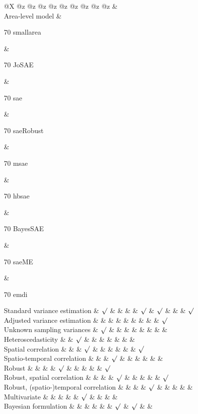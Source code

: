 @X @z @z @z @z @z @z @z @z @z \&\\

Area-level model \&

70 smallarea

\&

70 JoSAE

\&

70 sae

\&

70 saeRobust

\&

70 msae

\&

70 hbsae

\&

70 BayesSAE

\&

70 saeME

\&

70 emdi

\hfill\break

Standard variance estimation \& \(\surd\) \& \& \& \& \(\surd\) \& \(\surd\) \& \& \&
\(\surd\)\\

Adjusted variance estimation \& \& \& \& \& \& \& \& \& \(\surd\)\\

Unknown sampling variances \& \(\surd\) \& \& \& \& \& \& \& \&\\

Heteroscedasticity \& \& \(\surd\) \& \& \& \& \& \& \&\\

Spatial correlation \& \& \& \(\surd\) \& \& \& \& \& \& \(\surd\)\\

Spatio-temporal correlation \& \& \& \(\surd\) \& \& \& \& \& \&\\

Robust \& \& \& \& \(\surd\) \& \& \& \& \& \(\surd\)\\

Robust, spatial correlation \& \& \& \& \(\surd\) \& \& \& \& \& \(\surd\)\\

Robust, (spatio-)temporal correlation \& \& \& \& \(\surd\) \& \& \& \& \&\\

Multivariate \& \& \& \& \& \(\surd\) \& \& \& \&\\

Bayesian formulation \& \& \& \& \& \& \(\surd\) \& \(\surd\) \& \&\\

